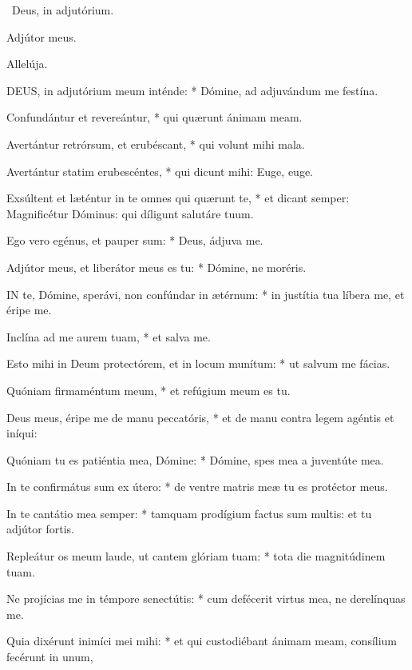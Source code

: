 \V\ Deus, in adjutórium.


 Adjútor meus.


 Allelúja.


\lettrine[lines=2]{D}{EUS}, in adjutórium meum inténde: * Dómine, ad adjuvándum me festína.

Confundántur et revereántur, * qui quærunt ánimam meam.

Avertántur retrórsum, et erubéscant, * qui volunt mihi mala.

Avertántur statim erubescéntes, * qui dicunt mihi: Euge, euge.

Exsúltent et læténtur in te omnes qui quærunt te, * et dicant semper: Magnificétur Dóminus: qui díligunt salutáre tuum.

Ego vero egénus, et pauper sum: * Deus, ádjuva me.

Adjútor meus, et liberátor meus es tu: * Dómine, ne moréris.


\lettrine[lines=2]{I}{N} te, Dómine, sperávi, non confúndar in ætérnum: * in justítia tua líbera me, et éripe me.

Inclína ad me aurem tuam, * et salva me.

Esto mihi in Deum protectórem, et in locum munítum: * ut salvum me fácias.

Quóniam firmaméntum meum, * et refúgium meum es tu.

Deus meus, éripe me de manu peccatóris, * et de manu contra legem agéntis et iníqui:

Quóniam tu es patiéntia mea, Dómine: * Dómine, spes mea a juventúte mea.

In te confirmátus sum ex útero: * de ventre matris meæ tu es protéctor meus.

In te cantátio mea semper: * tamquam prodígium factus sum multis: et tu adjútor fortis.

Repleátur os meum laude, ut cantem glóriam tuam: * tota die magnitúdinem tuam.

Ne projícias me in témpore senectútis: * cum defécerit virtus mea, ne derelínquas me.

Quia dixérunt inimíci mei mihi: * et qui custodiébant ánimam meam, consílium fecérunt in unum,

